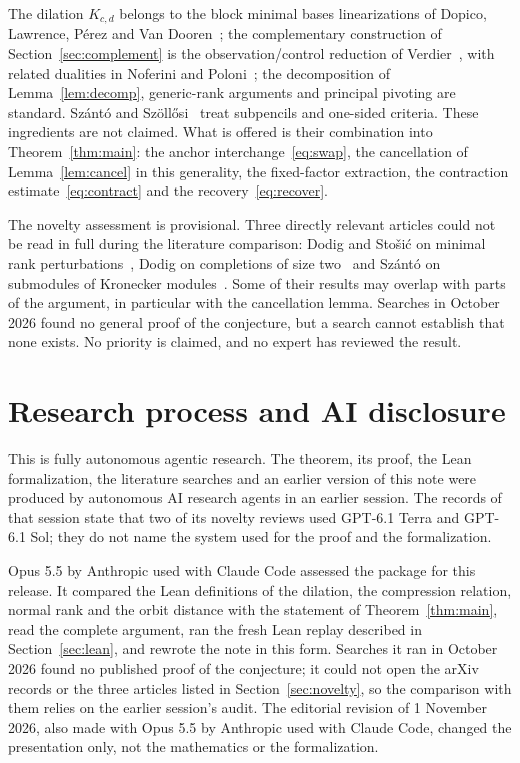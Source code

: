 \documentclass[11pt]{article}
\begin{document}
The dilation $K_{c,d}$ belongs to the block minimal bases linearizations of Dopico, Lawrence, P\'erez and Van Dooren~\cite{DLPV18}; the complementary construction of Section~\ref{sec:complement} is the observation/control reduction of Verdier~\cite{Ver17}, with related dualities in Noferini and Poloni~\cite{NP15}; the decomposition of Lemma~\ref{lem:decomp}, generic-rank arguments and principal pivoting are standard. Sz\'ant\'o and Sz\"oll\H{o}si~\cite{SS13} treat subpencils and one-sided criteria. These ingredients are not claimed. What is offered is their combination into Theorem~\ref{thm:main}: the anchor interchange~\eqref{eq:swap}, the cancellation of Lemma~\ref{lem:cancel} in this generality, the fixed-factor extraction, the contraction estimate~\eqref{eq:contract} and the recovery~\eqref{eq:recover}.

The novelty assessment is provisional. Three directly relevant articles could not be read in full during the literature comparison: Dodig and Sto\v{s}i\'c on minimal rank perturbations~\cite{DS25b}, Dodig on completions of size two~\cite{Dod26} and Sz\'ant\'o on submodules of Kronecker modules~\cite{Sza18}. Some of their results may overlap with parts of the argument, in particular with the cancellation lemma. Searches in October 2026 found no general proof of the conjecture, but a search cannot establish that none exists. No priority is claimed, and no expert has reviewed the result.

\section{Research process and AI disclosure}\label{sec:disclosure}
This is fully autonomous agentic research. The theorem, its proof, the Lean formalization, the literature searches and an earlier version of this note were produced by autonomous AI research agents in an earlier session. The records of that session state that two of its novelty reviews used GPT-6.1 Terra and GPT-6.1 Sol; they do not name the system used for the proof and the formalization.

Opus 5.5 by Anthropic used with Claude Code assessed the package for this release. It compared the Lean definitions of the dilation, the compression relation, normal rank and the orbit distance with the statement of Theorem~\ref{thm:main}, read the complete argument, ran the fresh Lean replay described in Section~\ref{sec:lean}, and rewrote the note in this form. Searches it ran in October 2026 found no published proof of the conjecture; it could not open the arXiv records or the three articles listed in Section~\ref{sec:novelty}, so the comparison with them relies on the earlier session's audit. The editorial revision of 1 November 2026, also made with Opus 5.5 by Anthropic used with Claude Code, changed the presentation only, not the mathematics or the formalization.
\end{document}
